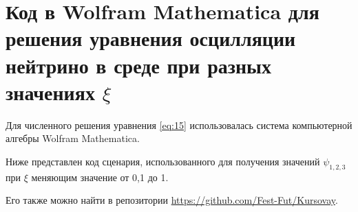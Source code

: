 \section{Код в Wolfram Mathematica для решения уравнения осцилляции нейтрино в среде при разных значениях \(\xi\)}
\label{app: code-python-vis}

Для численного решения уравнения \eqref{eq:15} использовалась система компьютерной алгебры \textsf{Wolfram Mathematica}. 


Ниже представлен код сценария, использованного для получения значений \(\psi_{1,2,3}\) при \(\xi\) меняющим значение от 0,1 до 1.

Его также можно найти в репозитории \url{https://github.com/Fest-Fut/Kursovay}.

\inputminted[linenos,breaklines,fontsize=\scriptsize]{Markdown}{Sun RKF.md}

